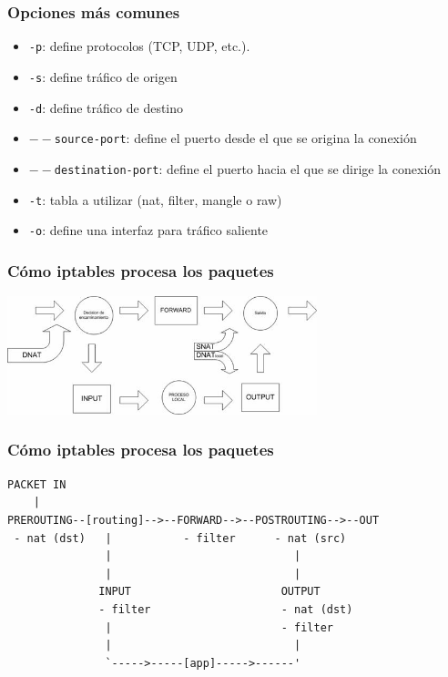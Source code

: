 \documentclass{beamer}
\begin{document}
\begin{frame}
\frametitle{Opciones más comunes}


\begin{itemize}
\item \texttt{-p}: define protocolos (TCP, UDP, etc.).
\item \texttt{-s}: define tráfico de origen
\item \texttt{-d}: define tráfico de destino
\item \texttt{$--$source-port}: define el puerto desde el que se origina la conexión
\item \texttt{$--$destination-port}: define el puerto hacia el que se dirige la conexión
\item \texttt{-t}: tabla a utilizar (nat, filter, mangle o raw)
\item \texttt{-o}: define una interfaz para tráfico saliente
\end{itemize}

\end{frame}


\begin{frame}[fragile]
\frametitle{Cómo iptables procesa los paquetes}

  \begin{center}
    \includegraphics[width=9cm]{figs/iptables-flow.jpg}
  \end{center}

\end{frame}


\begin{frame}[fragile]
\frametitle{Cómo iptables procesa los paquetes}

\begin{verbatim}
PACKET IN
    |
PREROUTING--[routing]-->--FORWARD-->--POSTROUTING-->--OUT
 - nat (dst)   |           - filter      - nat (src)
               |                            |
               |                            |
              INPUT                       OUTPUT
              - filter                    - nat (dst)
               |                          - filter
               |                            |
               `----->-----[app]----->------'
\end{verbatim}

\end{frame}
\end{document}
